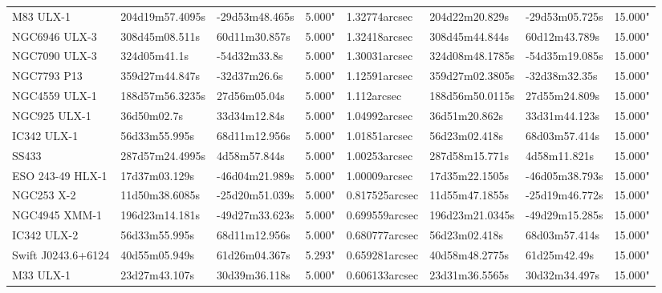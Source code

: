 \begin{tabular}{llllllll}
         M83 ULX-1 & 204d19m57.4095s & -29d53m48.465s &       5.000" &             1.32774arcsec &  204d22m20.829s & -29d53m05.725s &    15.000" \\
     NGC6946 ULX-3 &  308d45m08.511s &  60d11m30.857s &       5.000" &             1.32418arcsec &  308d45m44.844s &  60d12m43.789s &    15.000" \\
     NGC7090 ULX-3 &    324d05m41.1s &   -54d32m33.8s &       5.000" &             1.30031arcsec & 324d08m48.1785s & -54d35m19.085s &    15.000" \\
       NGC7793 P13 &  359d27m44.847s &   -32d37m26.6s &       5.000" &             1.12591arcsec & 359d27m02.3805s &  -32d38m32.35s &    15.000" \\
     NGC4559 ULX-1 & 188d57m56.3235s &   27d56m05.04s &       5.000" &               1.112arcsec & 188d56m50.0115s &  27d55m24.809s &    15.000" \\
      NGC925 ULX-1 &     36d50m02.7s &   33d34m12.84s &       5.000" &             1.04992arcsec &   36d51m20.862s &  33d31m44.123s &    15.000" \\
       IC342 ULX-1 &   56d33m55.995s &  68d11m12.956s &       5.000" &             1.01851arcsec &   56d23m02.418s &  68d03m57.414s &    15.000" \\
             SS433 & 287d57m24.4995s &   4d58m57.844s &       5.000" &             1.00253arcsec &  287d58m15.771s &   4d58m11.821s &    15.000" \\
  ESO 243-49 HLX-1 &   17d37m03.129s & -46d04m21.989s &       5.000" &             1.00009arcsec &  17d35m22.1505s & -46d05m38.793s &    15.000" \\
        NGC253 X-2 &  11d50m38.6085s & -25d20m51.039s &       5.000" &            0.817525arcsec &  11d55m47.1855s & -25d19m46.772s &    15.000" \\
     NGC4945 XMM-1 &  196d23m14.181s & -49d27m33.623s &       5.000" &            0.699559arcsec & 196d23m21.0345s & -49d29m15.285s &    15.000" \\
       IC342 ULX-2 &   56d33m55.995s &  68d11m12.956s &       5.000" &            0.680777arcsec &   56d23m02.418s &  68d03m57.414s &    15.000" \\
Swift J0243.6+6124 &   40d55m05.949s &  61d26m04.367s &       5.293" &            0.659281arcsec &  40d58m48.2775s &   61d25m42.49s &    15.000" \\
         M33 ULX-1 &   23d27m43.107s &  30d39m36.118s &       5.000" &            0.606133arcsec &  23d31m36.5565s &  30d32m34.497s &    15.000" \\

\end{tabular}
